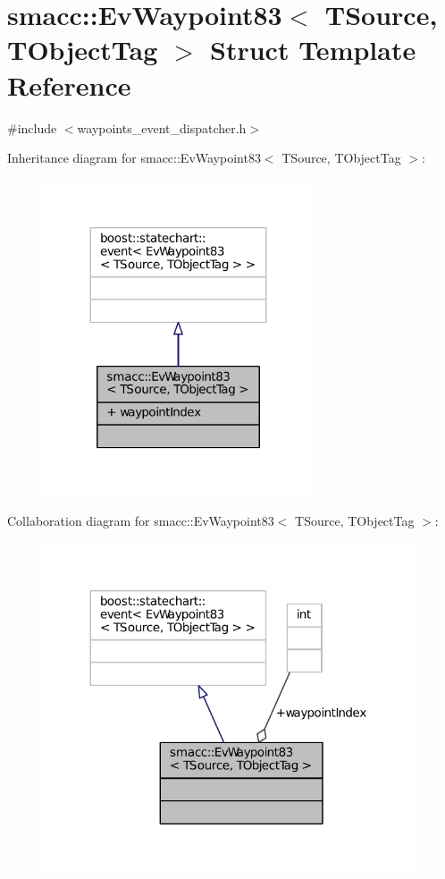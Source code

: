 \hypertarget{structsmacc_1_1EvWaypoint83}{}\section{smacc\+:\+:Ev\+Waypoint83$<$ T\+Source, T\+Object\+Tag $>$ Struct Template Reference}
\label{structsmacc_1_1EvWaypoint83}


{\ttfamily \#include $<$waypoints\+\_\+event\+\_\+dispatcher.\+h$>$}



Inheritance diagram for smacc\+:\+:Ev\+Waypoint83$<$ T\+Source, T\+Object\+Tag $>$\+:
\nopagebreak
\begin{figure}[H]
\begin{center}
\leavevmode
\includegraphics[width=227pt]{structsmacc_1_1EvWaypoint83__inherit__graph}
\end{center}
\end{figure}


Collaboration diagram for smacc\+:\+:Ev\+Waypoint83$<$ T\+Source, T\+Object\+Tag $>$\+:
\nopagebreak
\begin{figure}[H]
\begin{center}
\leavevmode
\includegraphics[width=312pt]{structsmacc_1_1EvWaypoint83__coll__graph}
\end{center}
\end{figure}
